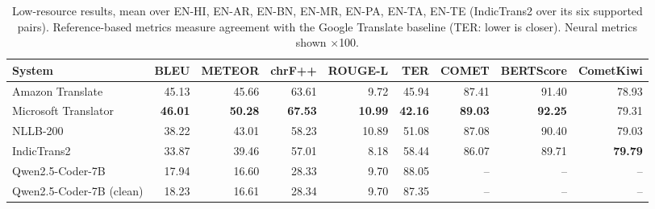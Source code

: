 \begin{table}[t]
\centering
\caption{Low-resource results, mean over EN-HI, EN-AR, EN-BN, EN-MR, EN-PA, EN-TA, EN-TE (IndicTrans2 over its six supported pairs). Reference-based metrics measure agreement with the Google Translate baseline (TER: lower is closer). Neural metrics shown $\times$100.\label{tab:low_resource}}
\begin{tabular}{lrrrrrrrr}
\toprule
System & BLEU & METEOR & chrF++ & ROUGE-L & TER & COMET & BERTScore & CometKiwi \\
\midrule
Amazon Translate & 45.13 & 45.66 & 63.61 & 9.72 & 45.94 & 87.41 & 91.40 & 78.93 \\
Microsoft Translator & \textbf{46.01} & \textbf{50.28} & \textbf{67.53} & \textbf{10.99} & \textbf{42.16} & \textbf{89.03} & \textbf{92.25} & 79.31 \\
NLLB-200 & 38.22 & 43.01 & 58.23 & 10.89 & 51.08 & 87.08 & 90.40 & 79.03 \\
IndicTrans2 & 33.87 & 39.46 & 57.01 & 8.18 & 58.44 & 86.07 & 89.71 & \textbf{79.79} \\
Qwen2.5-Coder-7B & 17.94 & 16.60 & 28.33 & 9.70 & 88.05 & -- & -- & -- \\
Qwen2.5-Coder-7B (clean) & 18.23 & 16.61 & 28.34 & 9.70 & 87.35 & -- & -- & -- \\
\bottomrule
\end{tabular}
\end{table}
